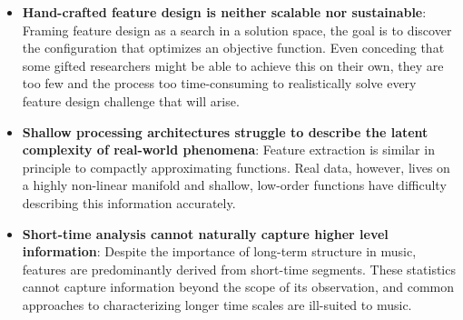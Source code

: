 \begin{itemize}

\item \textbf{Hand-crafted feature design is neither scalable nor sustainable}: Framing feature design as a search in a solution space, the goal is to discover the configuration that optimizes an objective function. Even conceding that some gifted researchers might be able to achieve this on their own, they are too few and the process too time-consuming to realistically solve every feature design challenge that will arise. \\
\item \textbf{Shallow processing architectures struggle to describe the latent complexity of real-world phenomena}: Feature extraction is similar in principle to compactly approximating functions. Real data, however, lives on a highly non-linear manifold and shallow, low-order functions have difficulty describing this information accurately. \\
\item \textbf{Short-time analysis cannot naturally capture higher level information}: Despite the importance of long-term structure in music, features are predominantly derived from short-time segments. These statistics cannot capture information beyond the scope of its observation, and common approaches to characterizing longer time scales are ill-suited to music.\\

\end{itemize}

